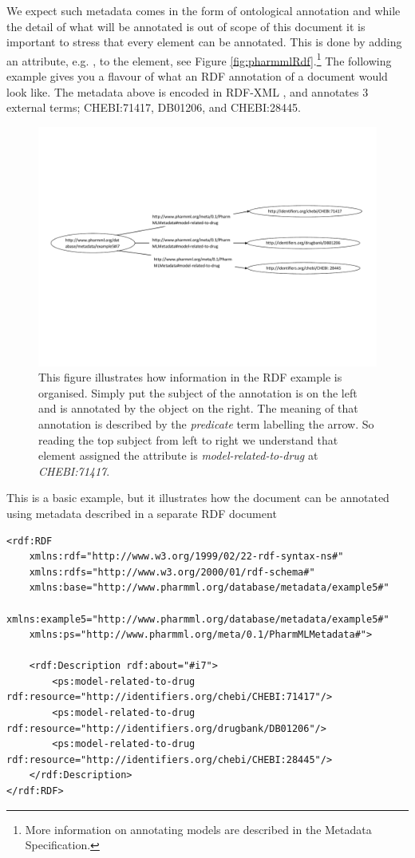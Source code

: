 We expect such metadata comes in the form of ontological annotation and
while the detail of what will be annotated is out of scope of this
document it is important to stress that every \pml element can be annotated. 
This is done by adding an attribute, e.g. , to the 
element, see Figure \ref{fig:pharmmlRdf}.\footnote{More information on 
annotating \pharmml models are described in the \pharmml Metadata Specification.} 
The following example gives you a flavour of what an RDF annotation of 
a \pharmml document would look like. 
The metadata above is encoded in RDF-XML \cite{Bono:2011fk}\cite{RDF_2014},
and annotates 3 external terms; CHEBI:71417, DB01206, and CHEBI:28445.

\begin{figure}[htbp]
\centering
\includegraphics[width=0.95\linewidth]{pics/metadatadiagram.pdf}
\caption{This figure illustrates how information in the RDF example is
organised. Simply put the subject of the annotation is on the left and
is annotated by the object on the right. The meaning of that
annotation is described by the \emph{predicate} term labelling the
arrow. So reading the top subject from left to right we understand that
element assigned the attribute  is \emph{model-related-to-drug} at \emph{CHEBI:71417}.}
\label{fig:rdf-graph}
\end{figure}
This is a basic example, but it illustrates how the \pharmml document can be annotated 
using metadata described in a separate RDF document

%
\lstset{language=XML}
\begin{lstlisting}
<rdf:RDF
    xmlns:rdf="http://www.w3.org/1999/02/22-rdf-syntax-ns#"
    xmlns:rdfs="http://www.w3.org/2000/01/rdf-schema#"
    xmlns:base="http://www.pharmml.org/database/metadata/example5#"
    xmlns:example5="http://www.pharmml.org/database/metadata/example5#"
    xmlns:ps="http://www.pharmml.org/meta/0.1/PharmMLMetadata#"> 
    
    <rdf:Description rdf:about="#i7">
        <ps:model-related-to-drug rdf:resource="http://identifiers.org/chebi/CHEBI:71417"/>
        <ps:model-related-to-drug rdf:resource="http://identifiers.org/drugbank/DB01206"/>
        <ps:model-related-to-drug rdf:resource="http://identifiers.org/chebi/CHEBI:28445"/>
    </rdf:Description>
</rdf:RDF>
\end{lstlisting}

